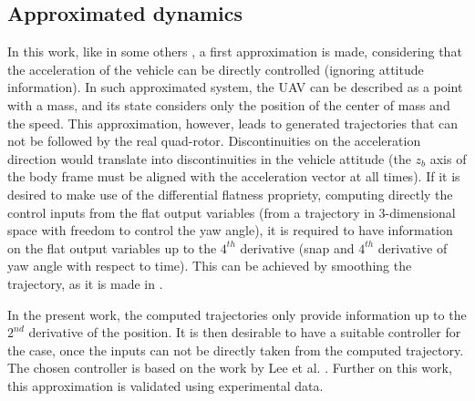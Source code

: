  \subsection{Approximated dynamics}
 In this work, like in some others \cite{ref:quad, MILP}, a first approximation is made, considering that the acceleration of the vehicle can be directly controlled (ignoring attitude information). In such approximated system, the UAV can be described as a point with a mass, and its state considers only the position of the center of mass and the speed.  This approximation, however, leads to generated trajectories that can not be followed by the real quad-rotor. Discontinuities on the acceleration direction would translate into discontinuities in the vehicle attitude (the $z_b$ axis of the body frame must be aligned with the acceleration vector at all times). If it is desired to make use of the differential flatness propriety, computing directly the control inputs from the flat output variables (from a trajectory in 3-dimensional space with freedom to control the yaw angle), it is required to have information on the flat output variables up to the $4^{th}$ derivative (snap and $4^{th}$  derivative of yaw angle with respect to time). This can be achieved by smoothing the trajectory, as it is made in \cite{ref:quad}.
 \par
 In the present work, the computed trajectories only provide information up to the $2^{nd}$ derivative of the position. It is then desirable to have a suitable controller for the case, once the inputs can not be directly taken from the computed trajectory. The chosen controller is based on the work by Lee et al. \cite{Lee}. Further on this work, this approximation is validated using experimental data.
 